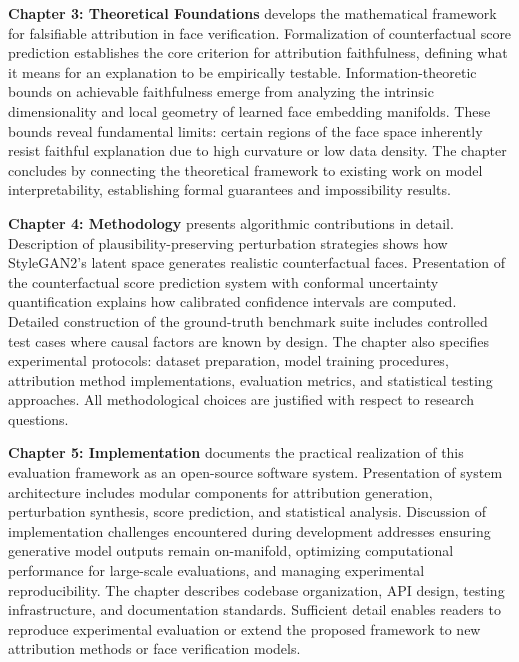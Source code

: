 \textbf{Chapter 3: Theoretical Foundations} develops the mathematical framework for falsifiable attribution in face verification. Formalization of counterfactual score prediction establishes the core criterion for attribution faithfulness, defining what it means for an explanation to be empirically testable. Information-theoretic bounds on achievable faithfulness emerge from analyzing the intrinsic dimensionality and local geometry of learned face embedding manifolds. These bounds reveal fundamental limits: certain regions of the face space inherently resist faithful explanation due to high curvature or low data density. The chapter concludes by connecting the theoretical framework to existing work on model interpretability, establishing formal guarantees and impossibility results.

\textbf{Chapter 4: Methodology} presents algorithmic contributions in detail. Description of plausibility-preserving perturbation strategies shows how StyleGAN2's latent space generates realistic counterfactual faces. Presentation of the counterfactual score prediction system with conformal uncertainty quantification explains how calibrated confidence intervals are computed. Detailed construction of the ground-truth benchmark suite includes controlled test cases where causal factors are known by design. The chapter also specifies experimental protocols: dataset preparation, model training procedures, attribution method implementations, evaluation metrics, and statistical testing approaches. All methodological choices are justified with respect to research questions.

\textbf{Chapter 5: Implementation} documents the practical realization of this evaluation framework as an open-source software system. Presentation of system architecture includes modular components for attribution generation, perturbation synthesis, score prediction, and statistical analysis. Discussion of implementation challenges encountered during development addresses ensuring generative model outputs remain on-manifold, optimizing computational performance for large-scale evaluations, and managing experimental reproducibility. The chapter describes codebase organization, API design, testing infrastructure, and documentation standards. Sufficient detail enables readers to reproduce experimental evaluation or extend the proposed framework to new attribution methods or face verification models.

